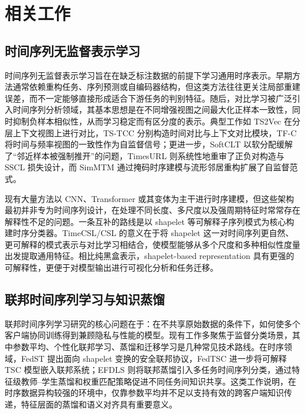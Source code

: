 \documentclass{article}
\begin{document}
\section{相关工作}

\subsection{时间序列无监督表示学习}

时间序列无监督表示学习旨在在缺乏标注数据的前提下学习通用时序表示。早期方法通常依赖重构任务、序列预测或自编码器结构，但这类方法往往更关注局部重建误差，而不一定能够直接形成适合下游任务的判别特征\cite{simmtm}。随后，对比学习被广泛引入时间序列分析领域，其基本思想是在不同增强视图之间最大化正样本一致性，同时抑制负样本相似性，从而学习稳定而有区分度的表示。典型工作如 TS2Vec 在分层上下文视图上进行对比\cite{ts2vec}，TS-TCC 分别构造时间对比与上下文对比模块\cite{tstcc}，TF-C 将时间与频率视图的一致性作为自监督信号\cite{tfc}；更进一步，SoftCLT 以软分配缓解了“邻近样本被强制推开”的问题\cite{softclt}，TimesURL 则系统性地重审了正负对构造与 SSCL 损失设计\cite{timesurl}，而 SimMTM 通过掩码时序建模与流形邻居重构扩展了自监督范式\cite{simmtm}。

现有大量方法以 CNN、Transformer 或其变体为主干进行时序建模\cite{fcnbaseline,timesnet}，但这些架构最初并非专为时间序列设计，在处理不同长度、多尺度以及强周期特征时常常存在解释性不足的问题。一条互补的路线是以 shapelet 等可解释子序列模式为核心构建时序分类器\cite{interpgn,unishape}。TimeCSL/CSL 的意义在于将 shapelet 这一对时间序列更自然、更可解释的模式表示与对比学习相结合，使模型能够从多个尺度和多种相似性度量出发提取通用特征\cite{timescsl}。相比纯黑盒表示，shapelet-based representation 具有更强的可解释性，更便于对模型输出进行可视化分析和任务迁移\cite{interpgn}。

\subsection{联邦时间序列学习与知识蒸馏}

联邦时间序列学习研究的核心问题在于：在不共享原始数据的条件下，如何使多个客户端协同训练得到兼顾隐私与性能的模型\cite{fedavg}。现有工作多聚焦于监督分类场景，其中参数平均、个性化联邦学习、蒸馏和迁移学习是几种常见技术路线\cite{fedkdsurvey}。在时序领域，FedST 提出面向 shapelet 变换的安全联邦协议\cite{fedst}，FedTSC 进一步将可解释 TSC 模型嵌入联邦系统\cite{fedtsc}；EFDLS 则将联邦蒸馏引入多任务时间序列分类，通过特征级教师--学生蒸馏和权重匹配策略促进不同任务间知识共享\cite{efdls}。这类工作说明，在时序数据异构较强的环境中，仅靠参数平均并不足以支持有效的跨客户端知识传递，特征层面的蒸馏和语义对齐具有重要意义\cite{moon,fedx}。
\end{document}
